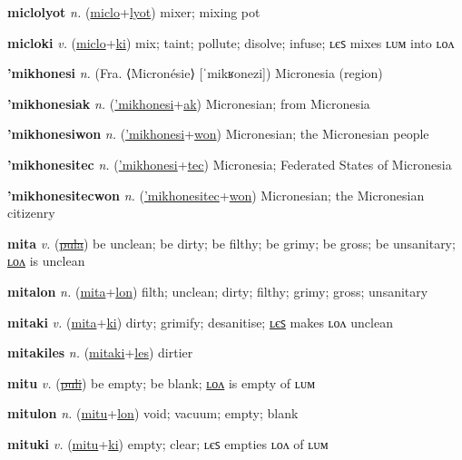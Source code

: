 \textbf{\hypertarget{miclolyot}{miclolyot}} \textit{n.} (\hyperlink{miclo}{miclo}+\allowbreak \hyperlink{lyot}{lyot})
mixer; mixing pot

\textbf{\hypertarget{micloki}{micloki}} \textit{v.} (\hyperlink{miclo}{miclo}+\allowbreak \hyperlink{ki}{ki})
mix; taint; pollute; disolve; infuse; ʟєꜱ mixes ʟᴜᴍ into ʟᴏᴧ

\textbf{\hypertarget{'mikhonesi}{'mikhonesi}} \textit{n.} (Fra. ⟨Micronésie⟩ [ˈmikʁonezi])
Micronesia (region)

\textbf{\hypertarget{'mikhonesiak}{'mikhonesiak}} \textit{n.} (\hyperlink{'mikhonesi}{'mikhonesi}+\allowbreak \hyperlink{ak}{ak})
Micronesian; from Micronesia

\textbf{\hypertarget{'mikhonesiwon}{'mikhonesiwon}} \textit{n.} (\hyperlink{'mikhonesi}{'mikhonesi}+\allowbreak \hyperlink{won}{won})
Micronesian; the Micronesian people

\textbf{\hypertarget{'mikhonesitec}{'mikhonesitec}} \textit{n.} (\hyperlink{'mikhonesi}{'mikhonesi}+\allowbreak \hyperlink{tec}{tec})
Micronesia; Federated States of Micronesia

\textbf{\hypertarget{'mikhonesitecwon}{'mikhonesitecwon}} \textit{n.} (\hyperlink{'mikhonesitec}{'mikhonesitec}+\allowbreak \hyperlink{won}{won})
Micronesian; the Micronesian citizenry

\textbf{\hypertarget{mita}{mita}} \textit{v.} (\hyperlink{pula}{\sout{pula}})
be unclean; be dirty; be filthy; be grimy; be gross; be unsanitary; \hyperlink{mitalon}{ʟᴏᴧ} is unclean

\textbf{\hypertarget{mitalon}{mitalon}} \textit{n.} (\hyperlink{mita}{mita}+\allowbreak \hyperlink{lon}{lon})
filth; unclean; dirty; filthy; grimy; gross; unsanitary

\textbf{\hypertarget{mitaki}{mitaki}} \textit{v.} (\hyperlink{mita}{mita}+\allowbreak \hyperlink{ki}{ki})
dirty; grimify; desanitise; \hyperlink{mitakiles}{ʟєꜱ} makes ʟᴏᴧ unclean

\textbf{\hypertarget{mitakiles}{mitakiles}} \textit{n.} (\hyperlink{mitaki}{mitaki}+\allowbreak \hyperlink{les}{les})
dirtier

\textbf{\hypertarget{mitu}{mitu}} \textit{v.} (\hyperlink{puli}{\sout{puli}})
be empty; be blank; \hyperlink{mitulon}{ʟᴏᴧ} is empty of ʟᴜᴍ

\textbf{\hypertarget{mitulon}{mitulon}} \textit{n.} (\hyperlink{mitu}{mitu}+\allowbreak \hyperlink{lon}{lon})
void; vacuum; empty; blank

\textbf{\hypertarget{mituki}{mituki}} \textit{v.} (\hyperlink{mitu}{mitu}+\allowbreak \hyperlink{ki}{ki})
empty; clear; ʟєꜱ empties ʟᴏᴧ of ʟᴜᴍ

